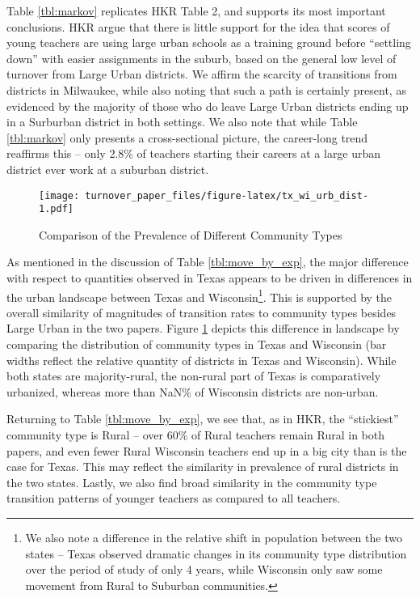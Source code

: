 \documentclass[]{article}
\let\rmarkdownfootnote\footnote%
\def\footnote{\protect\rmarkdownfootnote}
\begin{document}
Table \ref{tbl:markov} replicates HKR Table 2, and supports its most
important conclusions. HKR argue that there is little support for the
idea that scores of young teachers are using large urban schools as a
training ground before ``settling down'' with easier assignments in the
suburb, based on the general low level of turnover from Large Urban
districts. We affirm the scarcity of transitions from districts in
Milwaukee, while also noting that such a path is certainly present, as
evidenced by the majority of those who do leave Large Urban districts
ending up in a Surburban district in both settings. We also note that
while Table \ref{tbl:markov} only presents a cross-sectional picture,
the career-long trend reaffirms this -- only 2.8\% of teachers starting
their careers at a large urban district ever work at a suburban
district.

\begin{figure}[htbp]
\centering
\texttt{[image: turnover\_paper\_files/figure-latex/tx\_wi\_urb\_dist-1.pdf]}
\caption{\label{fig:ti_wi_urb}Comparison of the Prevalence of Different
Community Types}
\end{figure}

As mentioned in the discussion of Table \ref{tbl:move_by_exp}, the major
difference with respect to quantities observed in Texas appears to be
driven in differences in the urban landscape between Texas and
Wisconsin\footnote{We also note a difference in the relative shift in
  population between the two states -- Texas observed dramatic changes
  in its community type distribution over the period of study of only 4
  years, while Wisconsin only saw some movement from Rural to Suburban
  communities.}. This is supported by the overall similarity of
magnitudes of transition rates to community types besides Large Urban in
the two papers. Figure \ref{fig:ti_wi_urb} depicts this difference in
landscape by comparing the distribution of community types in Texas and
Wisconsin (bar widths reflect the relative quantity of districts in
Texas and Wisconsin). While both states are majority-rural, the
non-rural part of Texas is comparatively urbanized, whereas more than
NaN\% of Wisconsin districts are non-urban.

Returning to Table \ref{tbl:move_by_exp}, we see that, as in HKR, the
``stickiest'' community type is Rural -- over 60\% of Rural teachers
remain Rural in both papers, and even fewer Rural Wisconsin teachers end
up in a big city than is the case for Texas. This may reflect the
similarity in prevalence of rural districts in the two states. Lastly,
we also find broad similarity in the community type transition patterns
of younger teachers as compared to all teachers.
\end{document}
